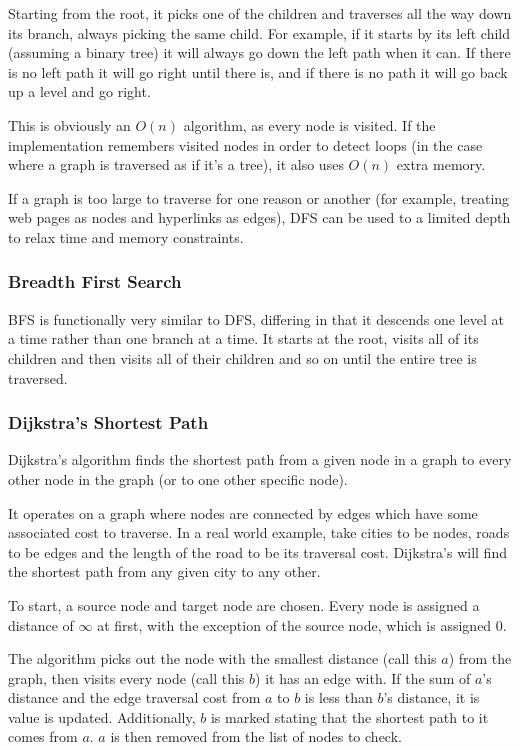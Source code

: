 \documentclass[]{article}
\begin{document}
Starting from the root, it picks one of the children and traverses all the way down its branch, always picking the same child. For example, if it starts by its left child (assuming a binary tree) it will always go down the left path when it can. If there is no left path it will go right until there is, and if there is no path it will go back up a level and go right.

This is obviously an $O(n)$ algorithm, as every node is visited. If the implementation remembers visited nodes in order to detect loops (in the case where a graph is traversed as if it's a tree), it also uses $O(n)$ extra memory.

If a graph is too large to traverse for one reason or another (for example, treating web pages as nodes and hyperlinks as edges), DFS can be used to a limited depth to relax time and memory constraints.

\subsubsection{Breadth First Search}

BFS is functionally very similar to DFS, differing in that it descends one level at a time rather than one branch at a time. It starts at the root, visits all of its children and then visits all of their children and so on until the entire tree is traversed.

\subsubsection{Dijkstra's Shortest Path}

Dijkstra's algorithm finds the shortest path from a given node in a graph to every other node in the graph (or to one other specific node).

It operates on a graph where nodes are connected by edges which have some associated cost to traverse. In a real world example, take cities to be nodes, roads to be edges and the length of the road to be its traversal cost. Dijkstra's will find the shortest path from any given city to any other.

To start, a source node and target node are chosen. Every node is assigned a distance of $\infty$ at first, with the exception of the source node, which is assigned 0.

The algorithm picks out the node with the smallest distance (call this $a$) from the graph, then visits every node (call this $b$) it has an edge with. If the sum of $a$'s distance and the edge traversal cost from $a$ to $b$ is less than $b$'s distance, it is value is updated. Additionally, $b$ is marked stating that the shortest path to it comes from $a$. $a$ is then removed from the list of nodes to check.
\end{document}

